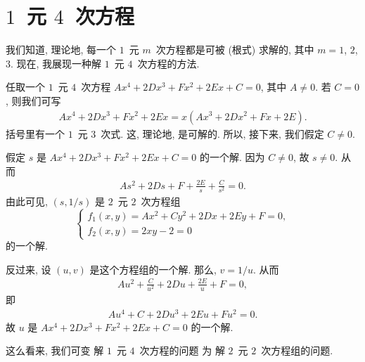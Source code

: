 \section{\texorpdfstring{\(1\)~元 \(4\)~次方程}%
  {1 元 4 次方程}}

我们知道, 理论地,
每一个 \(1\)~元 \(m\)~次方程都是可被 (根式) 求解的,
其中 \(m = 1\), \(2\), \(3\).
现在, 我展现一种解 \(1\)~元 \(4\)~次方程的方法.

任取一个 \(1\)~元 \(4\)~次方程
\(Ax^4 + 2Dx^3 + Fx^2 + 2Ex + C = 0\),
其中 \(A \neq 0\).
若 \(C = 0\), 则我们可写
\begin{align*}
    Ax^4 + 2Dx^3 + Fx^2 + 2Ex = x(Ax^3 + 2Dx^2 + Fx + 2E).
\end{align*}
括号里有一个 \(1\)~元 \(3\)~次式.
这, 理论地, 是可解的.
所以, 接下来, 我们假定 \(C \neq 0\).

假定 \(s\) 是
\(Ax^4 + 2Dx^3 + Fx^2 + 2Ex + C = 0\)
的一个解.
因为 \(C \neq 0\), 故 \(s \neq 0\).
从而
\begin{align*}
    As^2 + 2Ds + F + \frac{2E}{s} + \frac{C}{s^2} = 0.
\end{align*}
由此可见, \((s, 1/s)\) 是 \(2\)~元 \(2\)~次方程组
\begin{equation}
    \begin{cases}
        f_1 (x, y) = Ax^2 + Cy^2 + 2Dx + 2Ey + F = 0, \\
        f_2 (x, y) = 2xy - 2 = 0
    \end{cases}
    \label{eq:A0401}
\end{equation}
的一个解.

反过来, 设 \((u, v)\) 是这个方程组的一个解.
那么, \(v = 1/u\).
从而
\begin{align*}
    Au^2 + \frac{C}{u^2} + 2Du + \frac{2E}{u} + F = 0,
\end{align*}
即
\begin{align*}
    Au^4 + C + 2Du^3 + 2Eu + Fu^2 = 0.
\end{align*}
故 \(u\) 是
\(Ax^4 + 2Dx^3 + Fx^2 + 2Ex + C = 0\)
的一个解.

这么看来, 我们可变%
解 \(1\)~元 \(4\)~次方程的问题%
为%
解 \(2\)~元 \(2\)~次方程组的问题.

